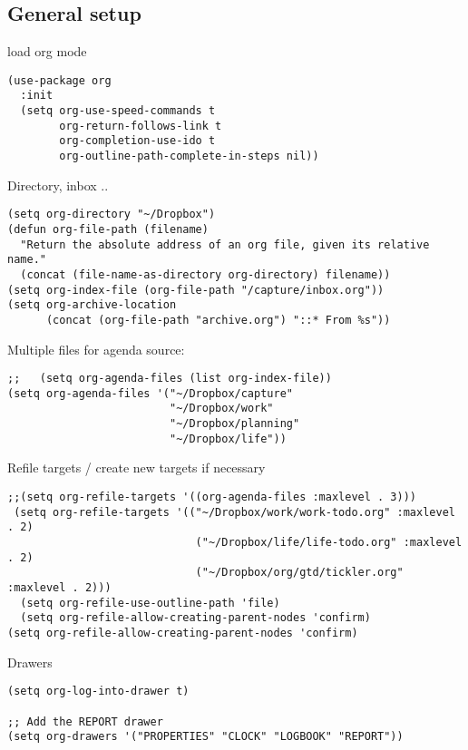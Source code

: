 \documentclass[12pt]{article}
\begin{document}
\subsection{General setup}
\label{sec-5-1}

load org mode

\lstset{language=Lisp,label= ,caption= ,numbers=none}
\begin{lstlisting}
(use-package org
  :init
  (setq org-use-speed-commands t
        org-return-follows-link t
        org-completion-use-ido t
        org-outline-path-complete-in-steps nil))
\end{lstlisting}

Directory, inbox ..

\lstset{language=Lisp,label= ,caption= ,numbers=none}
\begin{lstlisting}
(setq org-directory "~/Dropbox")
(defun org-file-path (filename)
  "Return the absolute address of an org file, given its relative name."
  (concat (file-name-as-directory org-directory) filename))
(setq org-index-file (org-file-path "/capture/inbox.org"))
(setq org-archive-location
      (concat (org-file-path "archive.org") "::* From %s"))
\end{lstlisting}

Multiple files for agenda source:

\lstset{language=Lisp,label= ,caption= ,numbers=none}
\begin{lstlisting}
;;   (setq org-agenda-files (list org-index-file))
(setq org-agenda-files '("~/Dropbox/capture"
                         "~/Dropbox/work"
                         "~/Dropbox/planning"
                         "~/Dropbox/life"))
\end{lstlisting}

Refile targets / create new targets if necessary

\lstset{language=Lisp,label= ,caption= ,numbers=none}
\begin{lstlisting}
;;(setq org-refile-targets '((org-agenda-files :maxlevel . 3)))
 (setq org-refile-targets '(("~/Dropbox/work/work-todo.org" :maxlevel . 2)
                             ("~/Dropbox/life/life-todo.org" :maxlevel . 2)
                             ("~/Dropbox/org/gtd/tickler.org" :maxlevel . 2)))
  (setq org-refile-use-outline-path 'file)
  (setq org-refile-allow-creating-parent-nodes 'confirm)
(setq org-refile-allow-creating-parent-nodes 'confirm)
\end{lstlisting}

Drawers 
\lstset{language=Lisp,label= ,caption= ,numbers=none}
\begin{lstlisting}
(setq org-log-into-drawer t)

;; Add the REPORT drawer
(setq org-drawers '("PROPERTIES" "CLOCK" "LOGBOOK" "REPORT"))
\end{lstlisting}
\end{document}
